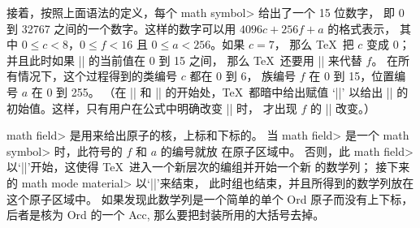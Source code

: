 接着，按照上面语法的定义，每个 \<math symbol> 给出了一个 15 位数字，
即 0 到 32767 之间的一个数字。这样的数字可以用 $4096c+256f+a$ 的格式表示，
其中 $0\le c<8$，$0\le f<16$ 且 $0\le a<256$。如果 $c=7$，
那么 \TeX\ 把 $c$ 变成 0；并且此时如果 |\fam| 的当前值在 0 到 15 之间，
那么 \TeX\ 还要用 |\fam| 来代替 $f$。
\1在所有情况下，这个过程得到的类编号 $c$ 都在 0 到 6，
族编号 $f$ 在 0 到 15，位置编号 $a$ 在 0 到 255。%
（在 |\everymath| 和 |\everydisplay| 的开始处，\TeX\ 都暗中给出赋值 `||'
以给出 |\fam| 的初始值。这样，只有用户在公式中明确改变 |\fam| 时，
才出现 $f$ 的 |\fam| 改变。）

\<math field> 是用来给出原子的核，上标和下标的。%
当 \<math field> 是一个 \<math symbol> 时，此符号的 $f$ 和 $a$ 的编号就放%
在原子区域中。%
否则，此 \<math field> 以`|{|'开始，这使得 \TeX\ 进入一个新层次的编组并开始一个新%
的数学列；
接下来的 \<math mode material> 以`|}|'来结束，
此时组也结束，并且所得到的数学列放在这个原子区域中。%
如果发现此数学列是一个简单的单个 Ord 原子而没有上下标，后者是核为 Ord 的一个 Acc,
那么要把封装所用的大括号去掉。

